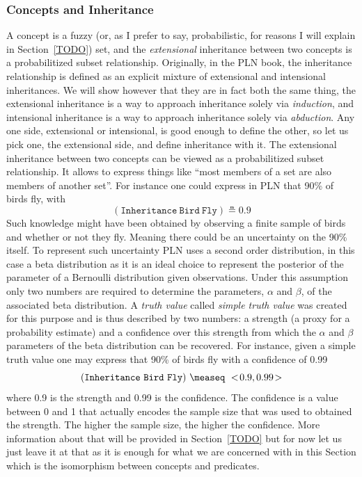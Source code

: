 \documentclass[]{article}
\begin{document}
\subsubsection{Concepts and Inheritance}
A concept is a fuzzy (or, as I prefer to say, probabilistic, for
reasons I will explain in Section~\ref{TODO}) set, and the
\emph{extensional} inheritance between two concepts is a
probabilitized subset relationship.  Originally, in the PLN book, the
inheritance relationship is defined as an explicit mixture of
extensional and intensional inheritances. We will show however that
they are in fact both the same thing, the extensional inheritance is a
way to approach inheritance solely via \emph{induction}, and
intensional inheritance is a way to approach inheritance solely via
\emph{abduction}.  Any one side, extensional or intensional, is good
enough to define the other, so let us pick one, the extensional side,
and define inheritance with it.  The extensional inheritance between
two concepts can be viewed as a probabilitized subset relationship.
It allows to express things like ``most members of a set are also
members of another set''.  For instance one could express in PLN that
90\% of birds fly, with
$$(\texttt{Inheritance}\ \texttt{Bird}\ \texttt{Fly}) \measeq 0.9$$
Such knowledge might have been obtained by observing a finite sample
of birds and whether or not they fly.  Meaning there could be an
uncertainty on the 90\% itself.  To represent such uncertainty PLN
uses a second order distribution, in this case a beta distribution as
it is an ideal choice to represent the posterior of the parameter of a
Bernoulli distribution given observations.  Under this assumption
only two numbers are required to determine the parameters, $\alpha$
and $\beta$, of the associated beta distribution.  A \emph{truth
value} called \emph{simple truth value} was created for this purpose
and is thus described by two numbers: a strength (a proxy for a
probability estimate) and a confidence over this strength from which
the $\alpha$ and $\beta$ parameters of the beta distribution can be
recovered.  For instance, given a simple truth value one may express
that 90\% of birds fly with a confidence of 0.99
$$(\texttt{Inheritance}\ \texttt{Bird}\ \texttt{Fly})\ \measeq\ \STV{0.9}{0.99}$$
where 0.9 is the strength and 0.99 is the confidence.  The confidence
is a value between 0 and 1 that actually encodes the sample size that
was used to obtained the strength.  The higher the sample size, the
higher the confidence.  More information about that will be provided
in Section~\ref{TODO} but for now let us just leave it at that as it
is enough for what we are concerned with in this Section which is the
isomorphism between concepts and predicates.
\end{document}
